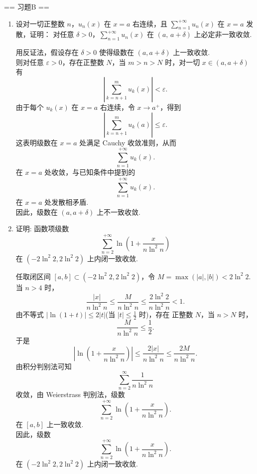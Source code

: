 == 习题B ==
\begin{enumerate}
    \item[1.]设对一切正整数 $n$，$u_n(x)$ 在 $x=a$ 右连续，且 $\displaystyle \sum_{n=1}^{+\infty}u_n(x)$ 在 $x=a$ 发散，证明：
    对任意 $\delta>0$，$\displaystyle \sum_{n=1}^{+\infty}u_n(x)$ 在 $(a,\,a+\delta)$ 上必定非一致收敛.
    \begin{solution}
        用反证法，假设存在 $\delta>0$ 使得级数在 $(a,a+\delta)$ 上一致收敛.\\
        则对任意 $\varepsilon>0$，存在正整数 $N$，当 $m>n>N$ 时，对一切 $x\in(a,a+\delta)$ 有 
        \[
        \left|\sum_{k=n+1}^{m} u_k(x)\right|<\varepsilon.
        \]
        由于每个 $u_k(x)$ 在 $x=a$ 右连续，令 $x\to a^+$，得到 
        \[
        \left|\sum_{k=n+1}^{m} u_k(a)\right|\le \varepsilon.
        \]
        这表明级数在 $x=a$ 处满足 Cauchy 收敛准则，从而
        \[
        \sum_{n=1}^{+\infty}u_k(x).
        \]
        在 $x=a$ 处收敛，与已知条件中提到的
        \[
        \sum_{n=1}^{+\infty}u_k(x).
        \]
        在 $x=a$ 处发散相矛盾.\\
        因此，级数在 $(a,a+\delta)$ 上不一致收敛.
    \end{solution}

    \item[2.]证明: 函数项级数
    \[\displaystyle\sum_{n = 2}^{+\infty}\ln \left(1 + \frac{x}{n\ln^{2}n}\right)\]
    在 \((- 2\ln^{2}2,2\ln^{2}2)\) 上内闭一致收敛.
    \begin{solution}
        任取闭区间 $[a,b]\subset (-2\ln^2 2, 2\ln^2 2)$，令 $M=\max(|a|,|b|)<2\ln^2 2$.\\
        当 $n>4$ 时，
        \[
        \frac{|x|}{n\ln^2 n}\le \frac{M}{n\ln^2 n}\le \frac{2\ln^2 2}{n\ln^2 n}<1.
        \]
        由不等式 $|\ln(1+t)|\le 2|t|$(当 $|t|\le \frac{1}{2}$ 时)，存在 正整数 $N$，当 $n>N$ 时，
        \[
        \frac{M}{n\ln^2 n}\le \frac{1}{2}.
        \]
        于是
        \[
        \left|\ln\left(1+\frac{x}{n\ln^2 n}\right)\right|\le \frac{2|x|}{n\ln^2 n}\le \frac{2M}{n\ln^2 n}.
        \]
        由积分判别法可知 
        \[
        \sum_{n=2}^{\infty} \frac{1}{n\ln^2 n}
        \]
        收敛，由 Weierstrass 判别法，级数
        \[
        \sum_{n=2}^{+\infty}\ln\left(1+\frac{x}{n\ln^2n}\right).
        \]
        在 $[a,b]$ 上一致收敛.\\
        因此，级数
        \[
        \sum_{n=2}^{+\infty}\ln\left(1+\frac{x}{n\ln^2n}\right).
        \]
        在 $(-2\ln^2 2, 2\ln^2 2)$ 上内闭一致收敛.
    \end{solution}
    

\end{enumerate}
